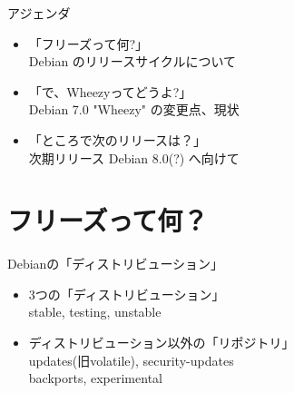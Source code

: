 \begin{frame}{アジェンダ}
\begin{itemize}
 \item {\color{red}「フリーズって何?」 \\
  Debian のリリースサイクルについて}
 \item  「で、Wheezyってどうよ?」\\
   Debian 7.0 "Wheezy" の変更点、現状
 \item 「ところで次のリリースは？」\\
   次期リリース Debian 8.0(?) へ向けて
\end{itemize}
\end{frame}

\section{フリーズって何？}


\begin{frame}
\begin{center}
\end{center}
\end{frame}

{
\begin{frame}[plain]%
\end{frame}
}

\begin{frame}{Debianの「ディストリビューション」}

\begin{itemize}
\item 3つの「ディストリビューション」\\
  stable, testing, unstable
\item ディストリビューション以外の「リポジトリ」\\
  updates(旧volatile), security-updates \\
  backports, experimental \\
\end{itemize}

\end{frame}

\begin{frame}
\begin{center}
\end{center}
\end{frame}

